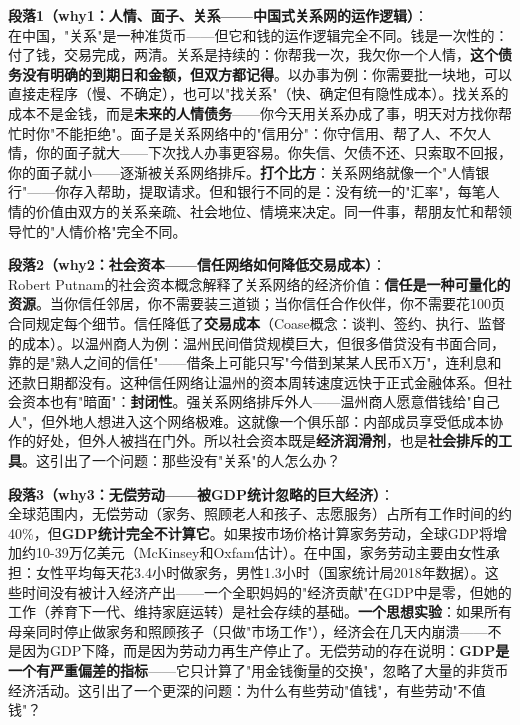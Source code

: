 \documentclass[../main.tex]{subfiles}
\begin{document}
	\textbf{段落1（why1：人情、面子、关系——中国式关系网的运作逻辑）}：\\
	在中国，"关系"是一种准货币——但它和钱的运作逻辑完全不同。钱是一次性的：付了钱，交易完成，两清。关系是持续的：你帮我一次，我欠你一个人情，\textbf{这个债务没有明确的到期日和金额，但双方都记得}。以办事为例：你需要批一块地，可以直接走程序（慢、不确定），也可以"找关系"（快、确定但有隐性成本）。找关系的成本不是金钱，而是\textbf{未来的人情债务}——你今天用关系办成了事，明天对方找你帮忙时你"不能拒绝"。面子是关系网络中的"信用分"：你守信用、帮了人、不欠人情，你的面子就大——下次找人办事更容易。你失信、欠债不还、只索取不回报，你的面子就小——逐渐被关系网络排斥。\textbf{打个比方}：关系网络就像一个"人情银行"——你存入帮助，提取请求。但和银行不同的是：没有统一的"汇率"，每笔人情的价值由双方的关系亲疏、社会地位、情境来决定。同一件事，帮朋友忙和帮领导忙的"人情价格"完全不同。

	\textbf{段落2（why2：社会资本——信任网络如何降低交易成本）}：\\
	Robert Putnam的社会资本概念解释了关系网络的经济价值：\textbf{信任是一种可量化的资源}。当你信任邻居，你不需要装三道锁；当你信任合作伙伴，你不需要花100页合同规定每个细节。信任降低了\textbf{交易成本}（Coase概念：谈判、签约、执行、监督的成本）。以温州商人为例：温州民间借贷规模巨大，但很多借贷没有书面合同，靠的是"熟人之间的信任"——借条上可能只写"今借到某某人民币X万"，连利息和还款日期都没有。这种信任网络让温州的资本周转速度远快于正式金融体系。但社会资本也有"暗面"：\textbf{封闭性}。强关系网络排斥外人——温州商人愿意借钱给"自己人"，但外地人想进入这个网络极难。这就像一个俱乐部：内部成员享受低成本协作的好处，但外人被挡在门外。所以社会资本既是\textbf{经济润滑剂}，也是\textbf{社会排斥的工具}。这引出了一个问题：那些没有"关系"的人怎么办？

	\textbf{段落3（why3：无偿劳动——被GDP统计忽略的巨大经济）}：\\
	全球范围内，无偿劳动（家务、照顾老人和孩子、志愿服务）占所有工作时间的约40\%，但\textbf{GDP统计完全不计算它}。如果按市场价格计算家务劳动，全球GDP将增加约10-39万亿美元（McKinsey和Oxfam估计）。在中国，家务劳动主要由女性承担：女性平均每天花3.4小时做家务，男性1.3小时（国家统计局2018年数据）。这些时间没有被计入经济产出——一个全职妈妈的"经济贡献"在GDP中是零，但她的工作（养育下一代、维持家庭运转）是社会存续的基础。\textbf{一个思想实验}：如果所有母亲同时停止做家务和照顾孩子（只做"市场工作"），经济会在几天内崩溃——不是因为GDP下降，而是因为劳动力再生产停止了。无偿劳动的存在说明：\textbf{GDP是一个有严重偏差的指标}——它只计算了"用金钱衡量的交换"，忽略了大量的非货币经济活动。这引出了一个更深的问题：为什么有些劳动"值钱"，有些劳动"不值钱"？
\end{document}
